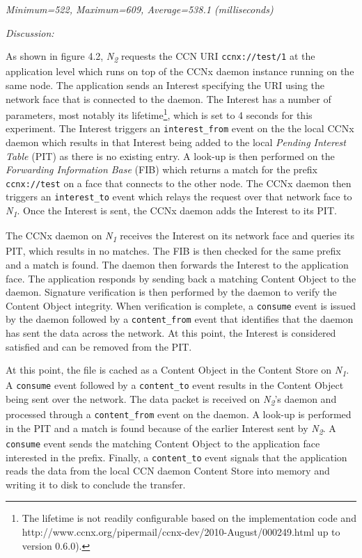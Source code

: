 \documentclass[a4paper,12pt]{report}      %
\begin{document}
\begin{center}\textsl{Minimum=522, Maximum=609, Average=538.1 (milliseconds)}\end{center}

\noindent\emph{Discussion:}

As shown in figure 4.2, \emph{N\textsubscript{2}} requests the CCN URI \verb!ccnx://test/1! at the application level which runs on top of the CCNx daemon instance running on the same node. The application sends an Interest 
specifying the URI using the network face that is connected to the daemon. The Interest has a
number of parameters, most notably its lifetime\footnote{The lifetime is not readily configurable based on the implementation code and http://www.ccnx.org/pipermail/ccnx-dev/2010-August/000249.html up to version 0.6.0).}, which is set to 4 seconds for this experiment\cite{CCNxIM}.
The Interest triggers an \verb!interest_from! event on the the local CCNx daemon which results in that
Interest being added to the local \textsl{Pending Interest Table} (PIT) as there is no existing entry. A look-up is then performed on the \textsl{Forwarding Information Base} (FIB) which returns a match for the prefix
\verb!ccnx://test! on a face that connects to the other node. The CCNx daemon then
triggers an \verb!interest_to! event which relays the request over that network face to \emph{N\textsubscript{1}}. Once
the Interest is sent, the CCNx daemon adds the Interest to its PIT.

The CCNx daemon on \emph{N\textsubscript{1}} receives the Interest on its network face and
queries its PIT, which results in no matches. The FIB is then checked for the same prefix and a match is found. The daemon then forwards the Interest to the application face. The application responds by sending back a matching Content Object to the daemon. Signature verification is then performed by the daemon to verify the Content Object integrity. When verification is complete, a \verb!consume! event is issued by the daemon followed by a \verb!content_from! event that identifies that the daemon has sent the data across the network. At this point, the Interest is considered satisfied and can be removed from the PIT.

At this point, the file is cached as a Content Object in the Content Store on  \emph{N\textsubscript{1}}. A
\verb!consume! event followed by a \verb!content_to! event results in the Content Object being sent over the network. The data packet is received on \emph{N\textsubscript{2}}'s daemon and processed through a \verb!content_from! event on the daemon. A look-up is performed in the PIT and a match is found because of the earlier Interest sent by \emph{N\textsubscript{2}}. A \verb!consume! event sends the matching Content Object to the application face interested in the prefix. Finally, a \verb!content_to! event signals that the application reads the data from the local CCN daemon Content Store into memory and writing it to disk to conclude the transfer.
\end{document}
